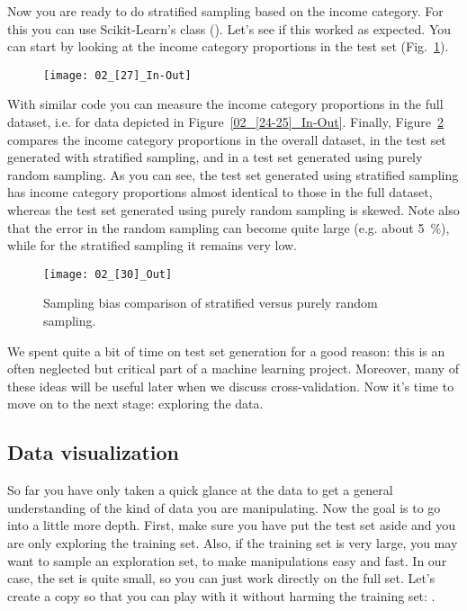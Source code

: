 Now you are ready to do stratified sampling based on the income category. For this you can use Scikit-Learn's  class (). Let's see if this worked as expected. You can start by looking at the income category proportions in the test set (Fig.~\ref{02_[27]_In-Out}).
\begin{figure}[h!t]
\centering
\texttt{[image: 02\_[27]\_In-Out]}
\caption{}\label{02_[27]_In-Out}
\end{figure}

With similar code you can measure the income category proportions in the full dataset, i.e. for data depicted in Figure~\ref{02_[24-25]_In-Out}. Finally, Figure~\ref{02_[30]_Out} compares the income category proportions in the overall dataset, in the test set generated with stratified sampling, and in a test set generated using purely random sampling. As you can see, the test set generated using stratified sampling has income category proportions almost identical to those in the full dataset, whereas the test set generated using purely random sampling is skewed. Note also that the error in the random sampling can become quite large (e.g. about \SI{5}{\percent}), while for the stratified sampling it remains very low.
\begin{figure}[h!t]
\centering
\vspace{1pt}\texttt{[image: 02\_[30]\_Out]}
\caption{Sampling bias comparison of stratified versus purely random sampling.}\label{02_[30]_Out}
\end{figure}

We spent quite a bit of time on test set generation for a good reason: this is an often neglected but critical part of a machine learning project. Moreover, many of these ideas will be useful later when we discuss cross-validation. Now it's time to move on to the next stage: exploring the data.
\subsection{Data visualization}
So far you have only taken a quick glance at the data to get a general understanding of the kind of data you are manipulating. Now the goal is to go into a little more depth. First, make sure you have put the test set aside and you are only exploring the training set. Also, if the training set is very large, you may want to sample an exploration set, to make manipulations easy and fast. In our case, the set is quite small, so you can just work directly on the full set. Let's create a copy so that you can play with it without harming the training set: .

